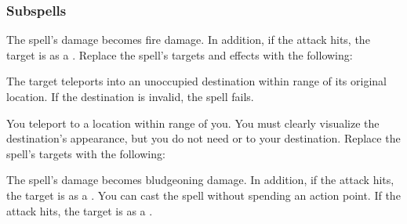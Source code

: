 \subsubsection{Subspells}
The spell's damage becomes fire damage.
In addition, if the attack hits, the target is  as a .
Replace the spell's targets and effects with the following:
\begin{spellcontent}
\begin{augmenttargetinginfo}
\end{augmenttargetinginfo}
\begin{augmenteffects}
\spelleffect
The target teleports into an unoccupied destination within \rngmed range of its original location.
If the destination is invalid, the spell fails.
\end{augmenteffects}
\end{spellcontent}
You teleport to a location within \rngext range of you.
You must clearly visualize the destination's appearance, but you do not need  or  to your destination.
Replace the spell's targets with the following:
\begin{spellcontent}
\begin{augmenttargetinginfo}
\end{augmenttargetinginfo}
\end{spellcontent}
The spell's damage becomes bludgeoning damage.
In addition, if the attack hits, the target is  as a .
You can cast the spell without spending an action point.
If the attack hits, the target is  as a .
